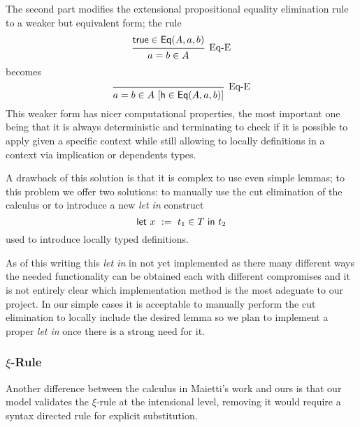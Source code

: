 	The second part modifies the extensional propositional equality elimination rule to a weaker but equivalent form; the rule
	\[
	\begin{prooftree}
	\hypo{\s{true}\in \s{Eq}(A,a,b)}
	\infer1[Eq-E]{a = b \in A}
	\end{prooftree}
	\]
	becomes
	\[
	\begin{prooftree}
	\infer0[Eq-E]{a = b \in A\ [{\s{h}\in \s{Eq}(A,a,b)}]}
	\end{prooftree}
	\]	
	This weaker form has nicer computational properties, the most important one being that it is always deterministic and terminating to check if it is possible to apply given a specific context while still allowing to locally definitions in a context via implication or dependents types.
	
	A drawback of this solution is that it is complex to use even simple lemmas; to this problem we offer two solutions: to manually use the cut elimination of the calculus or to introduce a new \emph{let in} construct \[\s{let}\ x\ :=\ t_1 \in T\ \s{in}\ t_2\] used to introduce locally typed definitions.
	
	As of this writing this \emph{let in} in not yet implemented as there many different ways the needed functionality can be obtained each with different compromises and it is not entirely clear which implementation method is the most adeguate to our project. In our simple cases it is acceptable to manually perform the cut elimination to locally include the desired lemma so we plan to implement a proper \emph{let in} once there is a strong need for it.
	
	\subsubsection{$\xi$-Rule}
	Another difference between the calculus in Maietti's work and ours is that our model validates the $\xi$-rule at the intensional level, removing it would require a syntax directed rule for explicit substitution.	
	